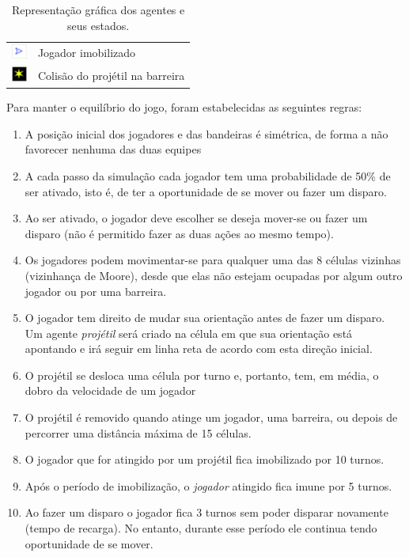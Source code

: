 \documentclass[preprint,12pt]{elsarticle}
\begin{document}
\begin{table}[h!]
\begin{center}
\begin{tabular}{ c  p{8cm} }
			\includegraphics[width=5mm, height=5mm]{figures/player_stopped.png}
			& 
			Jogador imobilizado \\
			
			\includegraphics[width=5mm, height=5mm]{figures/fired_wall.png}
			& 
			Colisão do projétil na barreira \\
			\bottomrule
		\end{tabular}
		\caption{Representação gráfica dos agentes e seus estados.}
		\label{tbl:graphics}
	\end{center}
\end{table}

Para manter o equilíbrio do jogo, foram estabelecidas as seguintes regras:

\begin{enumerate}
	\setlength\itemsep{0em}
	\item A posição inicial dos jogadores e das bandeiras é simétrica, de forma a não favorecer nenhuma das duas equipes
	\item A cada passo da simulação cada jogador tem uma probabilidade de 50\% de ser ativado, isto é, de ter a oportunidade de se mover ou fazer um disparo.
	\item Ao ser ativado, o jogador deve escolher se deseja mover-se ou fazer um disparo (não é permitido fazer as duas ações ao mesmo tempo).
	\item Os jogadores podem movimentar-se para qualquer uma das 8 células vizinhas (vizinhança de Moore), desde que elas não estejam ocupadas por algum outro jogador ou por uma barreira.
	\item O jogador tem direito de mudar sua orientação antes de fazer um disparo. Um agente \textit{projétil} será criado na célula em que sua orientação está apontando e irá seguir em linha reta de acordo com esta direção inicial.
	\item O projétil se desloca uma célula por turno e, portanto, tem, em média, o dobro da velocidade de um jogador
	\item O projétil é removido quando atinge um jogador, uma barreira, ou depois de percorrer uma distância máxima de 15 células.	
	\item O jogador que for atingido por um projétil fica imobilizado por 10 turnos.
	\item Após o período de imobilização, o \textit{jogador} atingido fica imune por 5 turnos.
	\item Ao fazer um disparo o jogador fica 3 turnos sem poder disparar novamente (tempo de recarga). No entanto, durante esse período ele continua tendo oportunidade de se mover.
\end{enumerate}
\end{document}
